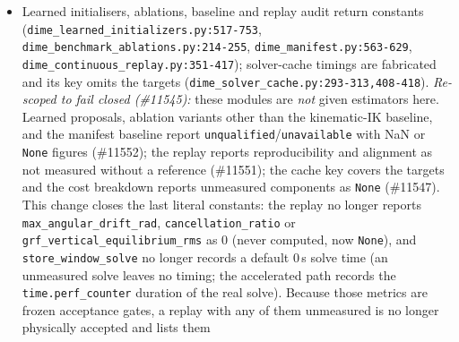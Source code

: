 \documentclass[11pt,a4paper]{article}
\begin{document}
\begin{itemize}[nosep]
    $N=4$, prior information $\mathrm{diag}(10^4,10^2)$ about $(0.5,-3)$),
    all seven sliding windows match the analytic batch least-squares solution
    to $10^{-7}$; before the fix the mismatch was $4.9$ in a single window
    and $4.7$ across sliding windows, and $0.024$ with no prior (dropped
    samples discarded).  With discrete transitions
    $q_{k+1}-q_k-\Delta t\,v_k$ and $v_{k+1}-v_k$ between samples, a first version
    that marginalised only the dropped samples' own rows lost the transition into
    the new first knot (mismatch $1.76$); and a transient non-finite window
    discarded the prior permanently.  Both are now covered by tests.  A first fixture without the velocity rows was not
    discriminating: with two rows per knot the dropped rows are exactly
    satisfiable and carry no information forward.  Nonlinear residuals are
    linearised once at the accepted solution (first-order arrival cost), which
    is not exact.  Reproduce with
    \texttt{python3 -m pytest tests/unit/estimation/test\_moving\_horizon\_arrival\_cost.py}.
  \item Learned initialisers, ablations, baseline and replay audit return
    constants (\texttt{dime\_learned\_initializers.py:517-753},
    \texttt{dime\_benchmark\_ablations.py:214-255}, \texttt{dime\_manifest.py:563-629},
    \texttt{dime\_continuous\_replay.py:351-417}); solver-cache timings are fabricated
    and its key omits the targets (\texttt{dime\_solver\_cache.py:293-313,408-418}).
    \emph{Re-scoped to fail closed (\#11545):} these modules are \emph{not}
    given estimators here.  Learned proposals, ablation variants other than the
    kinematic-IK baseline, and the manifest baseline report
    \texttt{unqualified}/\texttt{unavailable} with NaN or \texttt{None} figures
    (\#11552); the replay reports reproducibility and alignment as not measured
    without a reference (\#11551); the cache key covers the targets and the
    cost breakdown reports unmeasured components as \texttt{None} (\#11547).
    This change closes the last literal constants: the replay no longer
    reports \texttt{max\_angular\_drift\_rad}, \texttt{cancellation\_ratio} or
    \texttt{grf\_vertical\_equilibrium\_rms} as $0$ (never computed, now
    \texttt{None}), and \texttt{store\_window\_solve} no longer records a
    default $0$\,s solve time (an unmeasured solve leaves no timing; the
    accelerated path records the \texttt{time.perf\_counter} duration of the
    real solve).  Because those metrics are frozen acceptance gates, a replay
    with any of them unmeasured is no longer physically accepted and lists them

\end{itemize}
\end{document}
